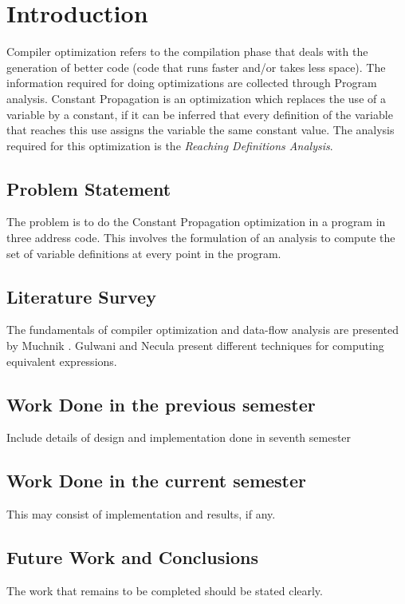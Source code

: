 \chapter{Introduction}
Compiler optimization refers to the compilation phase that deals with the  generation of better code (code that runs faster and/or takes less space). The information required for doing optimizations are collected through Program analysis. Constant Propagation is an optimization which replaces the use of a variable by a constant, if it can be inferred that every definition of the variable that reaches this use assigns the variable the same constant value. The analysis required for this optimization is the \textit{Reaching Definitions Analysis}. 
\section{Problem Statement}
The problem is to do the Constant Propagation optimization in a program in three address code. This involves the formulation of an analysis to compute the set of variable definitions at every point in the program.
\section{Literature Survey }
The fundamentals of compiler optimization and data-flow analysis are presented by Muchnik  \cite{much}. Gulwani and Necula \cite{sumit} present different techniques for computing equivalent expressions.
\section{Work Done in the previous semester}
Include details of design and implementation done in seventh semester
\section{Work Done in the current semester}
This may consist of implementation and results, if any.
\section{Future Work and Conclusions}
The work that remains to be completed should be stated clearly. 
